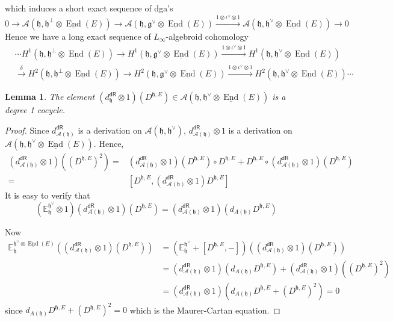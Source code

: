 \documentclass[12pt]{amsart}
\newtheorem{lem}[thm]{Lemma}
\theoremstyle{definition}
\theoremstyle{remark}
\numberwithin{equation}{section}
\newcommand{\CA}{{\mathcal A}}
\newcommand{\1}{{\mathbb{1}}}
\newcommand{\g}{\mathfrak{g}}
\newcommand{\h}{\mathfrak{h}}
\newcommand{\dr}{\mathsf{dR}}
\newcommand{\End}{\operatorname{End}}
\begin{document}
which induces a short exact sequence of dga's
\begin{equation*}
    0 \to \CA(\h,\h^{\perp}\otimes \underline{\End}(E)) \to \CA(\h, \g^{\vee}\otimes \underline{\End}(E)) \stackrel{1\otimes \iota^{\vee}\otimes 1}{\to} \CA(\h, \h^{\vee}\otimes \underline{\End}(E))\to 0
\end{equation*}
Hence we have a long exact sequence of $L_{\infty}$-algebroid cohomology
\begin{align*}
    &\cdots H^1(\h,\h^{\perp}\otimes \underline{\End}(E)) \to H^1(\h, \g^{\vee}\otimes \underline{\End}(E)) \stackrel{1\otimes \iota^{\vee}\otimes 1}{\to} H^1(\h, \h^{\vee}\otimes \underline{\End}(E))\\
    &\stackrel{\delta}{\to }H^2(\h,\h^{\perp}\otimes \underline{\End}(E))\to H^2(\h, \g^{\vee}\otimes \underline{\End}(E)) \stackrel{1\otimes \iota^{\vee}\otimes 1}{\to} H^2(\h, \h^{\vee}\otimes \underline{\End}(E))\cdots
\end{align*}
\begin{lem}
    The element $(d^{\dr}_{\h} \otimes 1)(D^{\h, E}) \in \CA(\h, \h^{\vee}\otimes \underline{\End}(E))$ is a degree 1 cocycle.
\end{lem}

\begin{proof}
     Since $d^{\dr}_{\CA(\h)}$ is a derivation on $\CA(\h, \h^{\vee})$, $d^{\dr}_{\CA(\h)}\otimes 1$ is a derivation on $\CA(\h, \h^{\vee}\otimes \underline{\End}(E))$. Hence,
     \begin{align*}
         (d^{\dr}_{\CA(\h)}\otimes 1)({(D^{\h, E})}^2) =& (d^{\dr}_{\CA(\h)}\otimes 1)(D^{\h, E}) \circ D^{\h, E} + D^{\h, E}\circ (d^{\dr}_{\CA(\h)}\otimes 1)(D^{\h, E})\\
         =& [D^{\h, E}, (d^{\dr}_{\CA(\h)}\otimes 1)D^{\h, E}]
     \end{align*}
     It is easy to verify that
     $$(\mathbb{E}_{\h}^{\h^{\vee}} \otimes 1)(d^{\dr}_{\CA(\h)}\otimes 1)(D^{\h, E}) = (d^{\dr}_{\CA(\h)}\otimes 1)(d_{A(\h)}D^{\h, E})
     $$
     
     Now
     \begin{align*}
         \mathbb{E}_{\h}^{\h^{\vee}\otimes \underline{\End}(E)}((d^{\dr}_{\CA(\h)}\otimes 1)(D^{\h, E})) &= (\mathbb{E}_{\h}^{\h^{\vee}} + [D^{\h, E}, -])((d^{\dr}_{\CA(\h)}\otimes 1)(D^{\h, E}))\\
         &=(d^{\dr}_{\CA(\h)}\otimes 1)(d_{A(\h)}D^{\h, E}) + (d^{\dr}_{\CA(\h)}\otimes 1)({(D^{\h, E})}^2)  \\
         &= (d^{\dr}_{\CA(\h)}\otimes 1)(d_{A(\h)}D^{\h, E} + {(D^{\h, E})}^2) = 0
     \end{align*}
     since $d_{A(\h)}D^{\h, E} + {(D^{\h, E})}^2 = 0$ which is the Maurer-Cartan equation.
\end{proof}
\end{document}
